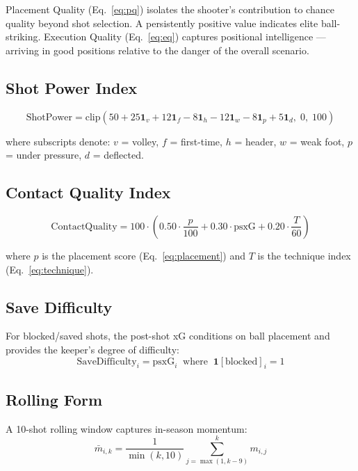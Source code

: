 \documentclass[12pt,a4paper]{article}
\begin{document}
Placement Quality (Eq.~\ref{eq:pq}) isolates the shooter's contribution to chance quality beyond shot selection. A persistently positive value indicates elite ball-striking. Execution Quality (Eq.~\ref{eq:eq}) captures positional intelligence — arriving in good positions relative to the danger of the overall scenario.

\subsection{Shot Power Index}

\begin{equation}
\text{ShotPower} = \text{clip}\!\left(50 + 25\mathbf{1}_v + 12\mathbf{1}_f - 8\mathbf{1}_h - 12\mathbf{1}_w - 8\mathbf{1}_p + 5\mathbf{1}_d,\; 0,\; 100\right)
\label{eq:power}
\end{equation}

where subscripts denote: $v$ = volley, $f$ = first-time, $h$ = header, $w$ = weak foot, $p$ = under pressure, $d$ = deflected.

\subsection{Contact Quality Index}

\begin{equation}
\text{ContactQuality} = 100 \cdot \!\left(0.50 \cdot \frac{p}{100} + 0.30 \cdot \text{psxG} + 0.20 \cdot \frac{T}{60}\right)
\label{eq:cq}
\end{equation}

where $p$ is the placement score (Eq.~\ref{eq:placement}) and $T$ is the technique index (Eq.~\ref{eq:technique}).

\subsection{Save Difficulty}

For blocked/saved shots, the post-shot xG conditions on ball placement and provides the keeper's degree of difficulty:
\begin{equation}
\text{SaveDifficulty}_i = \text{psxG}_i \;\;\text{where}\;\; \mathbf{1}[\text{blocked}]_i = 1
\end{equation}

\subsection{Rolling Form}

A 10-shot rolling window captures in-season momentum:
\begin{equation}
\bar{m}_{i,k} = \frac{1}{\min(k,10)}\sum_{j=\max(1,k-9)}^{k} m_{i,j}
\end{equation}
\end{document}
